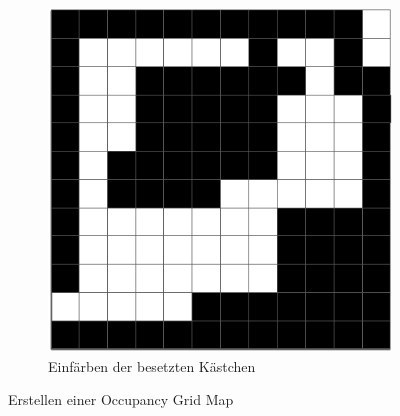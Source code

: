 \begin{figure}
\begin{subfigure}[t]{.3\textwidth}
    \centering
    \includegraphics[width=.8\linewidth]{pic/vorwissen/2c_occupgridmap.png}
    \caption{Einfärben der besetzten Kästchen}
  \end{subfigure}
  \caption{Erstellen einer Occupancy Grid Map}
  \label{fig:occupanygridmap}
\end{figure}
\mbox{}


